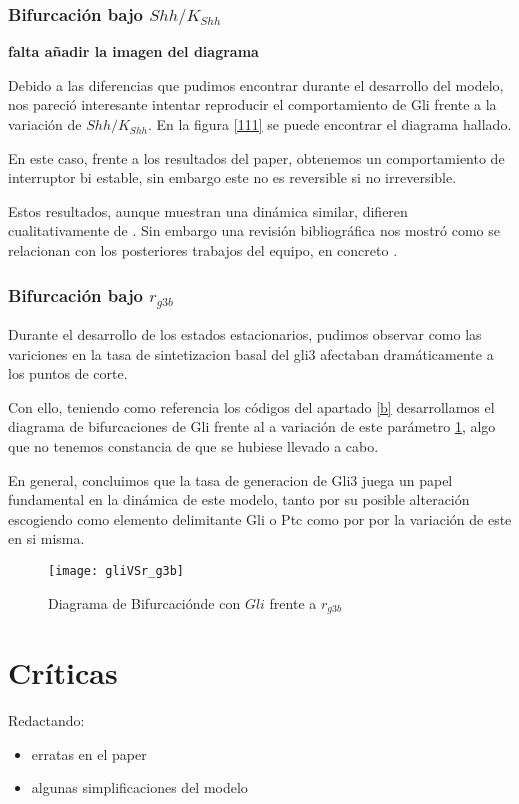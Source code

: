 \subsubsection{Bifurcación bajo $Shh/K_{Shh}$}

\textbf{falta añadir la imagen del diagrama}

Debido a las diferencias que pudimos encontrar durante el desarrollo del modelo, nos pareció interesante intentar reproducir el comportamiento de Gli frente a la variación de $Shh/K_{Shh}$.  En la figura \ref{111} se puede encontrar el diagrama hallado.

En este caso, frente a los resultados del paper, obtenemos un comportamiento de interruptor bi estable, sin embargo este no es reversible si no irreversible. 

Estos resultados, aunque muestran una dinámica similar, difieren cualitativamente de \cite{schaffer}. Sin embargo una revisión bibliográfica nos mostró como se relacionan con los posteriores trabajos del equipo, en concreto \cite{saha}.




\subsubsection{Bifurcación bajo $r_{g3b}$}
Durante el desarrollo de los estados estacionarios, pudimos observar como las variciones en la tasa de sintetizacion basal del gli3 afectaban dramáticamente a los puntos de corte.

 Con ello, teniendo como referencia los códigos del apartado \ref{b} desarrollamos el diagrama de bifurcaciones de Gli frente al a variación de este parámetro \ref{lai_2}, algo que no tenemos constancia de que se hubiese llevado a cabo.

 En general, concluimos que la tasa de generacion de Gli3 juega un papel fundamental en la dinámica de este modelo, tanto por su posible alteración escogiendo como elemento delimitante Gli o Ptc como por por la variación de este en si misma. 
 
\begin{figure}[h]
	\texttt{[image: gliVSr\_g3b]}
	\centering
	\caption{Diagrama de Bifurcaciónde \cite{schaffer} con $Gli$ frente a $r_{g3b}$}
	\label{lai_2}
\end{figure}

\section{Críticas}
Redactando:
\begin{itemize}
	\item erratas en el paper
	\item algunas simplificaciones del modelo
\end{itemize}



